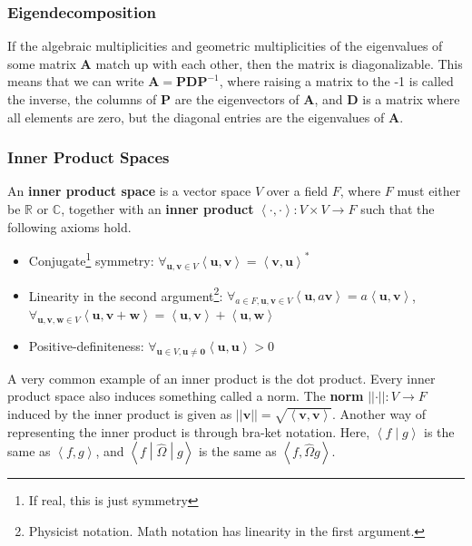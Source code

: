 \documentclass[10pt]{beamer}
\begin{document}
\begin{frame}
  \frametitle{Eigendecomposition}
  If the algebraic multiplicities and geometric multiplicities of the eigenvalues of some matrix $\mathbf{A}$ match up with each other, then the matrix is diagonalizable. This means that we can write $\mathbf{A} = \mathbf{PDP}^{-1}$, where raising a matrix to the -1 is called the inverse, the columns of $\mathbf{P}$ are the eigenvectors of $\mathbf{A}$, and $\mathbf{D}$ is a matrix where all elements are zero, but the diagonal entries are the eigenvalues of $\mathbf{A}$.
\end{frame}

\begin{frame}
  \frametitle{Inner Product Spaces}
  An \textbf{inner product space} is a vector space $V$ over a field $F$, where $F$ must either be $\mathbb{R}$ or $\mathbb{C}$, together with an \textbf{inner product} $\left<\cdot, \cdot\right>: V\times V\rightarrow F$ such that the following axioms hold.
  \begin{itemize}
  \item Conjugate\footnote{If real, this is just symmetry} symmetry: $\forall_{\mathbf{u}, \mathbf{v}\in V}\left<\mathbf{u}, \mathbf{v}\right> = \left<\mathbf{v}, \mathbf{u}\right>^*$
  \item Linearity in the second argument\footnote{Physicist notation. Math notation has linearity in the first argument.}: $\forall_{a\in F, \mathbf{u}, \mathbf{v}\in V}\left<\mathbf{u}, a\mathbf{v}\right> = a\left<\mathbf{u}, \mathbf{v}\right>$, $\forall_{\mathbf{u}, \mathbf{v}, \mathbf{w}\in V}\left<\mathbf{u}, \mathbf{v} + \mathbf{w}\right> = \left<\mathbf{u}, \mathbf{v}\right> + \left<\mathbf{u}, \mathbf{w}\right>$
  \item Positive-definiteness: $\forall_{\mathbf{u}\in V, \mathbf{u}\ne \mathbf{0}}\left<\mathbf{u}, \mathbf{u}\right> > 0$
  \end{itemize}

  A very common example of an inner product is the dot product. Every inner product space also induces something called a norm. The \textbf{norm} $\left|\left|\cdot\right|\right|: V\rightarrow F$ induced by the inner product is given as $\left|\left|\mathbf{v}\right|\right| = \sqrt{\left<\mathbf{v}, \mathbf{v}\right>}$. Another way of representing the inner product is through bra-ket notation. Here, $\left<f\middle|g\right>$ is the same as $\left<f, g\right>$, and $\left<f\middle|\hat{\Omega}\middle|g\right>$ is the same as $\left<f, \hat{\Omega}g\right>$.
\end{frame}
\end{document}
